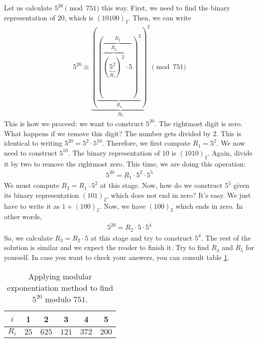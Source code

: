 \begin{example}
	Let us calculate $5^{20} \pmod{751}$ this way. First, we need to find the binary representation of $20$, which is $(10100)_2$. Then, we can write
		\begin{align*}
			5^{20} \equiv  \underbrace{\left(\underbrace{\left(\overbrace{\overbrace{\left(\underbrace{5^2}_{R_1}\right)^2}^{R_2} \cdot 5}^{R_3}\right)^2}_{R_4}\right)^2}_{R_5} \pmod{751}
		\end{align*}
	This is how we proceed: we want to construct $5^{20}$. The rightmost digit is zero. What happens if we remove this digit? The number gets divided by $2$. This is identical to writing $5^{20} = 5^2 \cdot 5^{10}$. Therefore, we first compute $R_1=5^2$. We now need to construct $5^{10}$. The binary representation of $10$ is $(1010)_2$. Again, divide it by two to remove the rightmost zero. This time, we are doing this operation:
		\begin{align*}
			5^{20} = R_1 \cdot 5^2 \cdot 5^5
		\end{align*}
	We must compute $R_2 = R_1 \cdot 5^2$ at this stage. Now, how do we construct $5^5$ given its binary representation $(101)_2$, which does not end in zero? It's easy. We just have to write it as $1+(100)_2$. Now, we have $(100)_2$ which ends in zero. In other words,
		\begin{align*}
			5^{20} = R_2 \cdot 5 \cdot 5^4
		\end{align*}
	So, we calculate $R_3 = R_2 \cdot 5$ at this stage and try to construct $5^4$. The rest of the solution is similar and we expect the reader to finish it. Try to find $R_4$ and $R_5$ for yourself. In case you want to check your answers, you can consult table \ref{table:modexp}.

	\begin{table}[ht]
		\centering
		\begin{tabular}{|c|c|c|c|c|c|}
			\hline
			$i$ & 1 & 2 & 3 & 4 & 5  \\
			\hline
			$R_i$ & $25$ & $625$ &  $121$ & $372$ & $200$\\
			\hline
		\end{tabular}
		\caption{Applying modular exponentiation method to find $5^{20}$ modulo $751$.}
		\label{table:modexp}
	\end{table}
\end{example}
